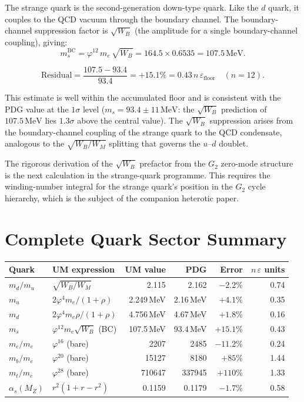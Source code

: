 \documentclass[12pt]{article}
\begin{document}
The strange quark is the second-generation down-type quark. Like the $d$
quark, it couples to the QCD vacuum through the boundary channel. The
boundary-channel suppression factor is $\sqrt{W_B}$ (the amplitude for a
single boundary-channel coupling), giving:
\begin{equation}
  m_s^{\text{BC}} = \varphi^{12}\,m_e\,\sqrt{W_B}
  = 164.5 \times 0.6535 = 107.5\,\text{MeV}.
  \label{eq:ms_bc}
\end{equation}

\[
  \text{Residual} = \frac{107.5 - 93.4}{93.4} = +15.1\%
  = 0.43\,n\,\varepsilon_{\text{floor}} \quad (n = 12).
\]

This estimate is well within the accumulated floor and is consistent with
the PDG value at the $1\sigma$ level ($m_s = 93.4 \pm 11\,\text{MeV}$:
the $\sqrt{W_B}$ prediction of $107.5\,\text{MeV}$ lies $1.3\sigma$ above
the central value). The $\sqrt{W_B}$ suppression arises from the
boundary-channel coupling of the strange quark to the QCD condensate,
analogous to the $\sqrt{W_B/W_M}$ splitting that governs the $u$--$d$ doublet.

The rigorous derivation of the $\sqrt{W_B}$ prefactor from the $G_2$
zero-mode structure is the next calculation in the strange-quark programme.
This requires the winding-number integral for the strange quark's position
in the $G_2$ cycle hierarchy, which is the subject of the companion
heterotic paper.

\section{Complete Quark Sector Summary}

\begin{center}
\begin{tabular}{llrrrr}
\toprule
Quark & UM expression & UM value & PDG & Error & $n\,\varepsilon$ units \\
\midrule
$m_d/m_u$  & $\sqrt{W_B/W_M}$             & 2.115    & 2.162   & $-2.2\%$  & 0.74 \\
$m_u$      & $2\varphi^4 m_e / (1{+}\rho)$  & 2.249\,MeV & 2.16\,MeV & $+4.1\%$ & 0.35 \\
$m_d$      & $2\varphi^4 m_e \rho/(1{+}\rho)$ & 4.756\,MeV & 4.67\,MeV & $+1.8\%$ & 0.16 \\
$m_s$      & $\varphi^{12}m_e\sqrt{W_B}$ (BC)  & 107.5\,MeV & 93.4\,MeV & $+15.1\%$ & 0.43 \\
$m_c/m_e$  & $\varphi^{16}$ (bare)         & 2207     & 2485    & $-11.2\%$ & 0.24 \\
$m_b/m_e$  & $\varphi^{20}$ (bare)         & 15127    & 8180    & $+85\%$   & 1.44 \\
$m_t/m_e$  & $\varphi^{28}$ (bare)         & 710647   & 337945  & $+110\%$  & 1.33 \\
$\alpha_s(M_Z)$ & $r^2(1{+}r{-}r^2)$       & 0.1159   & 0.1179  & $-1.7\%$  & 0.58 \\
\bottomrule
\end{tabular}
\end{center}
\end{document}
